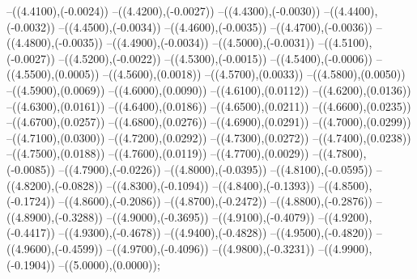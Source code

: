 {	--({\sx*(4.4100)},{\sy*(-0.0024)})
	--({\sx*(4.4200)},{\sy*(-0.0027)})
	--({\sx*(4.4300)},{\sy*(-0.0030)})
	--({\sx*(4.4400)},{\sy*(-0.0032)})
	--({\sx*(4.4500)},{\sy*(-0.0034)})
	--({\sx*(4.4600)},{\sy*(-0.0035)})
	--({\sx*(4.4700)},{\sy*(-0.0036)})
	--({\sx*(4.4800)},{\sy*(-0.0035)})
	--({\sx*(4.4900)},{\sy*(-0.0034)})
	--({\sx*(4.5000)},{\sy*(-0.0031)})
	--({\sx*(4.5100)},{\sy*(-0.0027)})
	--({\sx*(4.5200)},{\sy*(-0.0022)})
	--({\sx*(4.5300)},{\sy*(-0.0015)})
	--({\sx*(4.5400)},{\sy*(-0.0006)})
	--({\sx*(4.5500)},{\sy*(0.0005)})
	--({\sx*(4.5600)},{\sy*(0.0018)})
	--({\sx*(4.5700)},{\sy*(0.0033)})
	--({\sx*(4.5800)},{\sy*(0.0050)})
	--({\sx*(4.5900)},{\sy*(0.0069)})
	--({\sx*(4.6000)},{\sy*(0.0090)})
	--({\sx*(4.6100)},{\sy*(0.0112)})
	--({\sx*(4.6200)},{\sy*(0.0136)})
	--({\sx*(4.6300)},{\sy*(0.0161)})
	--({\sx*(4.6400)},{\sy*(0.0186)})
	--({\sx*(4.6500)},{\sy*(0.0211)})
	--({\sx*(4.6600)},{\sy*(0.0235)})
	--({\sx*(4.6700)},{\sy*(0.0257)})
	--({\sx*(4.6800)},{\sy*(0.0276)})
	--({\sx*(4.6900)},{\sy*(0.0291)})
	--({\sx*(4.7000)},{\sy*(0.0299)})
	--({\sx*(4.7100)},{\sy*(0.0300)})
	--({\sx*(4.7200)},{\sy*(0.0292)})
	--({\sx*(4.7300)},{\sy*(0.0272)})
	--({\sx*(4.7400)},{\sy*(0.0238)})
	--({\sx*(4.7500)},{\sy*(0.0188)})
	--({\sx*(4.7600)},{\sy*(0.0119)})
	--({\sx*(4.7700)},{\sy*(0.0029)})
	--({\sx*(4.7800)},{\sy*(-0.0085)})
	--({\sx*(4.7900)},{\sy*(-0.0226)})
	--({\sx*(4.8000)},{\sy*(-0.0395)})
	--({\sx*(4.8100)},{\sy*(-0.0595)})
	--({\sx*(4.8200)},{\sy*(-0.0828)})
	--({\sx*(4.8300)},{\sy*(-0.1094)})
	--({\sx*(4.8400)},{\sy*(-0.1393)})
	--({\sx*(4.8500)},{\sy*(-0.1724)})
	--({\sx*(4.8600)},{\sy*(-0.2086)})
	--({\sx*(4.8700)},{\sy*(-0.2472)})
	--({\sx*(4.8800)},{\sy*(-0.2876)})
	--({\sx*(4.8900)},{\sy*(-0.3288)})
	--({\sx*(4.9000)},{\sy*(-0.3695)})
	--({\sx*(4.9100)},{\sy*(-0.4079)})
	--({\sx*(4.9200)},{\sy*(-0.4417)})
	--({\sx*(4.9300)},{\sy*(-0.4678)})
	--({\sx*(4.9400)},{\sy*(-0.4828)})
	--({\sx*(4.9500)},{\sy*(-0.4820)})
	--({\sx*(4.9600)},{\sy*(-0.4599)})
	--({\sx*(4.9700)},{\sy*(-0.4096)})
	--({\sx*(4.9800)},{\sy*(-0.3231)})
	--({\sx*(4.9900)},{\sy*(-0.1904)})
	--({\sx*(5.0000)},{\sy*(0.0000)});
}
